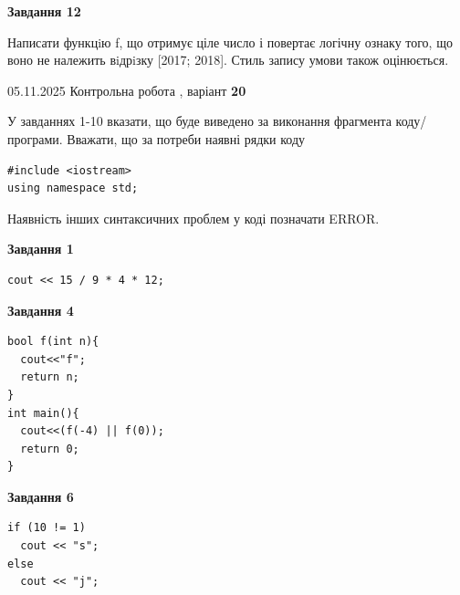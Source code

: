 \documentclass[12pt, ukrainian]{article}
\begin{document}
{\begin {large}
\begin{minipage}[t]{11.0cm}
\begin{center}
\textbf{Завдання 12}
\end{center}

Написати функцiю f, що отримує ціле число і повертає логічну ознаку того, що воно не належить вiдрiзку [2017; 2018]. Стиль запису умови також оцінюється.\par

\end{minipage}

\end {large}}
\newpage

{\Large{05.11.2025 Контрольна робота , варіант  \No \textbf { 20 }\par}}
{
\begin {large}
У завданнях 1-10 вказати, що буде виведено за виконання фрагмента коду/про\-гра\-ми.
Вважати, що за потреби наявні рядки коду
\begin{verbatim}
#include <iostream>
using namespace std;
\end{verbatim}
Наявність інших синтаксичних проблем у коді позначати ERROR.

\begin{minipage}[t]{7.0cm}

\begin{center}
\textbf{Завдання 1}
\end{center}
\vspace{-8mm}

\begin{verbatim}
cout << 15 / 9 * 4 * 12;
\end{verbatim}



\begin{center}
\textbf{Завдання 4}
\end{center}
\vspace{-8mm}

\begin{verbatim}
bool f(int n){
  cout<<"f";
  return n;
}
int main(){
  cout<<(f(-4) || f(0));
  return 0;
}
\end{verbatim}



\begin{center}
\textbf{Завдання 6}
\end{center}
\vspace{-8mm}

\begin{verbatim}
if (10 != 1)
  cout << "s";
else
  cout << "j";
\end{verbatim}




\end{minipage}
\end{large}}
\end{document}
